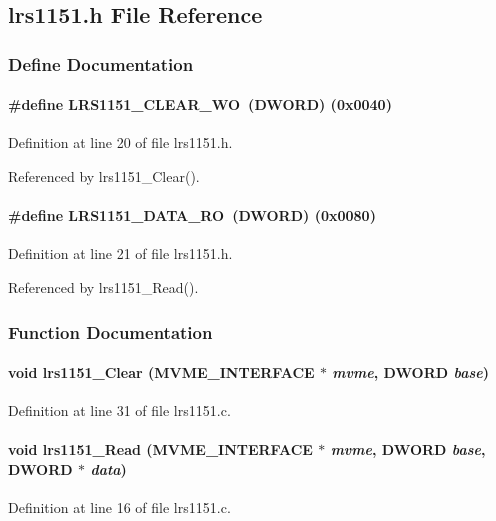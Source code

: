 \subsection{lrs1151.h File Reference}
\label{lrs1151_8h}


\subsubsection{Define Documentation}
\paragraph[{LRS1151\_\-CLEAR\_\-WO}]{\setlength{\rightskip}{0pt plus 5cm}\#define LRS1151\_\-CLEAR\_\-WO~({\bf DWORD}) (0x0040)}\hfill\label{lrs1151_8h_a20a33628454ca03d1eab32e89a7bd411}


Definition at line 20 of file lrs1151.h.

Referenced by lrs1151\_\-Clear().
\paragraph[{LRS1151\_\-DATA\_\-RO}]{\setlength{\rightskip}{0pt plus 5cm}\#define LRS1151\_\-DATA\_\-RO~({\bf DWORD}) (0x0080)}\hfill\label{lrs1151_8h_ac7a4b480a36b270763cdc0dfe36a8b88}


Definition at line 21 of file lrs1151.h.

Referenced by lrs1151\_\-Read().

\subsubsection{Function Documentation}
\paragraph[{lrs1151\_\-Clear}]{\setlength{\rightskip}{0pt plus 5cm}void lrs1151\_\-Clear ({\bf MVME\_\-INTERFACE} $\ast$ {\em mvme}, \/  {\bf DWORD} {\em base})}\hfill\label{lrs1151_8h_afd41b5af4f3ccc002e70b07380695c08}


Definition at line 31 of file lrs1151.c.
\paragraph[{lrs1151\_\-Read}]{\setlength{\rightskip}{0pt plus 5cm}void lrs1151\_\-Read ({\bf MVME\_\-INTERFACE} $\ast$ {\em mvme}, \/  {\bf DWORD} {\em base}, \/  {\bf DWORD} $\ast$ {\em data})}\hfill\label{lrs1151_8h_afba12c8d0f6c8b0194efb2dc53aa01d6}


Definition at line 16 of file lrs1151.c.